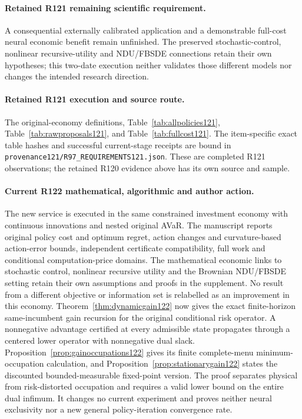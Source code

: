 \paragraph{Retained R121 remaining scientific requirement.}
A consequential externally calibrated application and a demonstrable full-cost neural economic benefit remain unfinished. The preserved stochastic-control, nonlinear recursive-utility and NDU/FBSDE connections retain their own hypotheses; this two-date execution neither validates those different models nor changes the intended research direction.

\paragraph{Retained R121 execution and source route.}
The original-economy definitions, Table~\ref{tab:allpolicies121}, Table~\ref{tab:rawproposals121}, and Table~\ref{tab:fullcost121}.
The item-specific exact table hashes and successful current-stage receipts are bound in \nolinkurl{provenance121/R97_REQUIREMENTS121.json}. These are completed R121 observations; the retained R120 evidence above has its own source and sample.
\paragraph{Current R122 mathematical, algorithmic and author action.}
The new service is executed in the same constrained investment economy with continuous innovations and nested original AVaR. The manuscript reports original policy cost and optimum regret, action changes and curvature-based action-error bounds, independent certificate compatibility, full work and conditional computation-price domains. The mathematical economic links to stochastic control, nonlinear recursive utility and the Brownian NDU/FBSDE setting retain their own assumptions and proofs in the supplement. No result from a different objective or information set is relabelled as an improvement in this economy. Theorem~\ref{thm:dynamicgain122} now gives the exact finite-horizon same-incumbent gain recursion for the original conditional risk operator. A nonnegative advantage certified at every admissible state propagates through a centered lower operator with nonnegative dual slack. Proposition~\ref{prop:gainoccupations122} gives its finite complete-menu minimum-occupation calculation, and Proposition~\ref{prop:stationarygain122} states the discounted bounded-measurable fixed-point version. The proof separates physical from risk-distorted occupation and requires a valid lower bound on the entire dual infimum. It changes no current experiment and proves neither neural exclusivity nor a new general policy-iteration convergence rate.
